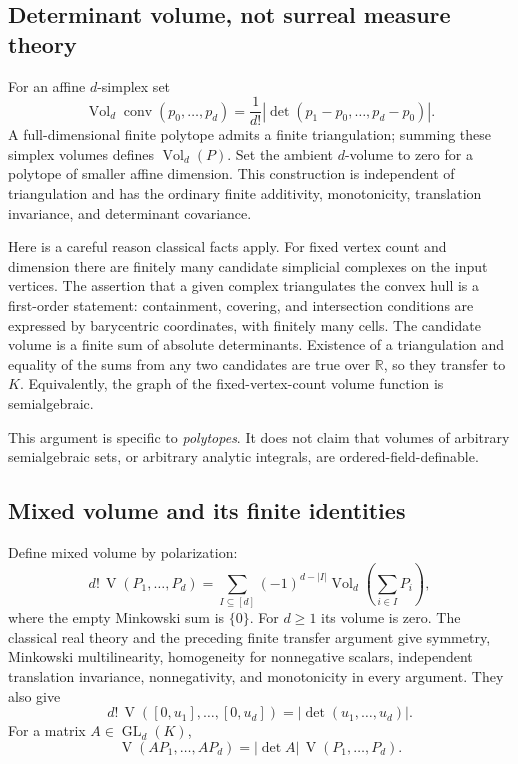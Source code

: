 \documentclass[11pt,a4paper]{article}
\numberwithin{equation}{section}
\theoremstyle{plain}
\newcommand{\R}{\mathbb R}
\newcommand{\conv}{\operatorname{conv}}
\newcommand{\Vol}{\operatorname{Vol}}
\newcommand{\MV}{\operatorname{V}}
\newcommand{\GL}{\operatorname{GL}}
\begin{document}
\subsection{Determinant volume, not surreal measure theory}
For an affine $d$-simplex set
\[
 \Vol_d\conv(p_0,\ldots,p_d)
   =\frac1{d!}\left|\det(p_1-p_0,\ldots,p_d-p_0)\right|.
\]
A full-dimensional finite polytope admits a finite triangulation; summing
these simplex volumes defines $\Vol_d(P)$. Set the ambient $d$-volume to
zero for a polytope of smaller affine dimension. This construction is
independent of triangulation and has the ordinary finite additivity,
monotonicity, translation invariance, and determinant covariance.

Here is a careful reason classical facts apply. For fixed vertex count
and dimension there are finitely many candidate simplicial complexes on
the input vertices. The assertion that a given complex triangulates the
convex hull is a first-order statement: containment, covering, and
intersection conditions are expressed by barycentric coordinates, with
finitely many cells. The candidate volume is a finite sum of absolute
determinants. Existence of a triangulation and equality of the sums from
any two candidates are true over $\R$, so they transfer to $K$. Equivalently,
the graph of the fixed-vertex-count volume function is semialgebraic.

This argument is specific to \emph{polytopes}. It does not claim that
volumes of arbitrary semialgebraic sets, or arbitrary analytic integrals,
are ordered-field-definable.

\subsection{Mixed volume and its finite identities}
Define mixed volume by polarization:
\begin{equation}
\label{poly:mv:eq:polarization}
 d!\,\MV(P_1,\ldots,P_d)
  =\sum_{I\subseteq[d]}(-1)^{d-|I|}
       \Vol_d\left(\sum_{i\in I}P_i\right),
\end{equation}
where the empty Minkowski sum is $\{0\}$. For $d\ge1$ its volume is zero.
The classical real theory \cite{mv:Schneider} and the preceding finite
transfer argument give symmetry, Minkowski multilinearity, homogeneity
for nonnegative scalars, independent translation invariance, nonnegativity,
and monotonicity in every argument. They also give
\begin{equation}
\label{poly:mv:eq:segment}
 d!\,\MV([0,u_1],\ldots,[0,u_d])
      =|\det(u_1,\ldots,u_d)|.
\end{equation}
For a matrix $A\in\GL_d(K)$,
\begin{equation}
\label{poly:mv:eq:covariance}
 \MV(AP_1,\ldots,AP_d)=|\det A|\,\MV(P_1,\ldots,P_d).
\end{equation}
\end{document}
